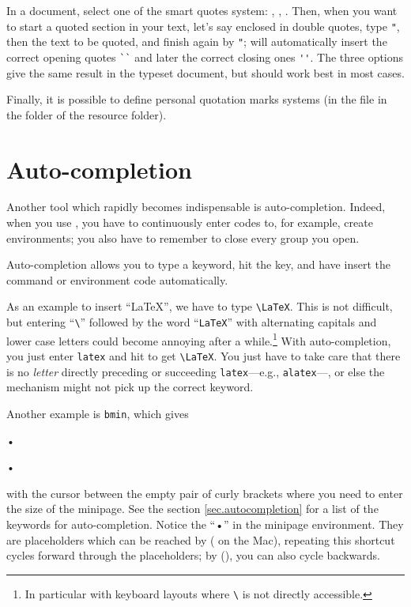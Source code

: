 In a  document, select one of the smart quotes system: \submenu{}\submenu{}, \submenu{}, \submenu{}. Then, when you want to start a quoted section in your text, let's say enclosed in double quotes, type \verb|"|, then the text to be quoted, and finish again by \verb|"|; {\Tw} will automatically insert the correct opening quotes \verb|``| and later the correct closing ones \verb|''|. The three options give the same result in the typeset document, but  should work best in most cases.

Finally, it is possible to define personal quotation marks systems (in the file  in the  folder of the resource folder).

\section{Auto-completion}

Another tool which rapidly becomes indispensable is auto-completion. Indeed, when you use {\AllTeX}, you have to continuously enter codes to, for example, create environments; you also have to remember to close every group you open.

Auto-completion allows you to type a keyword, hit the  key, and have {\Tw} insert the {\AllTeX} command or environment code automatically.

As an example to insert ``\LaTeX'', we have to type \verb|\LaTeX|. This is not difficult, but entering ``\verb|\|'' followed by the word ``\verb|LaTeX|'' with alternating capitals and lower case letters could become annoying after a while.\footnote{In particular with keyboard layouts where \texttt{\textbackslash} is not directly accessible.} With auto-completion, you just enter \verb|latex| and hit  to get \verb|\LaTeX|. You just have to take care that there is no \emph{letter} directly preceding or succeeding \verb|latex|---e.g., \verb|alatex|---, or else the mechanism might not pick up the correct keyword.

Another example is \verb|bmin|, which gives
\begin{verbExample}
\begin{minipage}{}
•
\end{minipage}•
\end{verbExample}
with the cursor between the empty pair of curly brackets where you need to enter the size of the minipage. See the section \ref{sec.autocompletion} for a list of the keywords for auto-completion. Notice the ``•'' in the minipage environment. They are placeholders which can be reached by  ( on the Mac), repeating this shortcut cycles forward through the placeholders; by  (), you can also cycle backwards.

